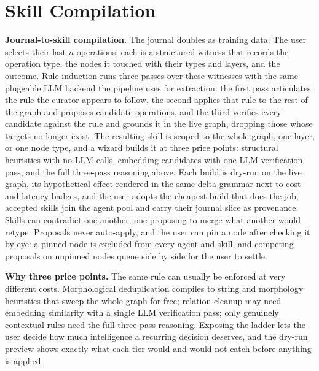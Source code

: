 \documentclass[sigconf]{acmart}
\begin{document}
\section{Skill Compilation}
\textbf{Journal-to-skill compilation.} The journal doubles as training data. The user selects their last $n$ operations; each is a structured witness that records the operation type, the nodes it touched with their types and layers, and the outcome. Rule induction runs three passes over these witnesses with the same pluggable LLM backend the pipeline uses for extraction: the first pass articulates the rule the curator appears to follow, the second applies that rule to the rest of the graph and proposes candidate operations, and the third verifies every candidate against the rule and grounds it in the live graph, dropping those whose targets no longer exist. The resulting skill is scoped to the whole graph, one layer, or one node type, and a wizard builds it at three price points: structural heuristics with no LLM calls, embedding candidates with one LLM verification pass, and the full three-pass reasoning above. Each build is dry-run on the live graph, its hypothetical effect rendered in the same delta grammar next to cost and latency badges, and the user adopts the cheapest build that does the job; accepted skills join the agent pool and carry their journal slice as provenance. Skills can contradict one another, one proposing to merge what another would retype. Proposals never auto-apply, and the user can pin a node after checking it by eye: a pinned node is excluded from every agent and skill, and competing proposals on unpinned nodes queue side by side for the user to settle.


\textbf{Why three price points.} The same rule can usually be enforced at very different costs. Morphological deduplication compiles to string and morphology heuristics that sweep the whole graph for free; relation cleanup may need embedding similarity with a single LLM verification pass; only genuinely contextual rules need the full three-pass reasoning. Exposing the ladder lets the user decide how much intelligence a recurring decision deserves, and the dry-run preview shows exactly what each tier would and would not catch before anything is applied.
\end{document}
